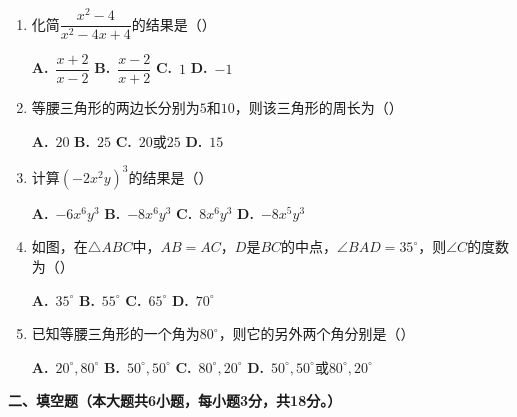 \documentclass[12pt, a4paper]{ctexart}
\begin{document}
\begin{enumerate}[label=\arabic*.]
\item 化简$\dfrac{x^{2}-4}{x^{2}-4x+4}$的结果是（\hspace{1cm}）
\begin{enumerate}[label=\Alph*.]
\quad \textbf{A.}~$\dfrac{x+2}{x-2}$ \quad \textbf{B.}~$\dfrac{x-2}{x+2}$ \quad \textbf{C.}~$1$ \quad \textbf{D.}~$-1$
\end{enumerate}

\item 等腰三角形的两边长分别为$5$和$10$，则该三角形的周长为（\hspace{1cm}）
\begin{enumerate}[label=\Alph*.]
\quad \textbf{A.}~$20$ \quad \textbf{B.}~$25$ \quad \textbf{C.}~$20$或$25$ \quad \textbf{D.}~$15$
\end{enumerate}

\item 计算$(-2x^{2}y)^{3}$的结果是（\hspace{1cm}）
\begin{enumerate}[label=\Alph*.]
\quad \textbf{A.}~$-6x^{6}y^{3}$ \quad \textbf{B.}~$-8x^{6}y^{3}$ \quad \textbf{C.}~$8x^{6}y^{3}$ \quad \textbf{D.}~$-8x^{5}y^{3}$
\end{enumerate}

\item 如图，在$\triangle ABC$中，$AB=AC$，$D$是$BC$的中点，$\angle BAD=35^{\circ}$，则$\angle C$的度数为（\hspace{1cm}）
\begin{enumerate}[label=\Alph*.]
\quad \textbf{A.}~$35^{\circ}$ \quad \textbf{B.}~$55^{\circ}$ \quad \textbf{C.}~$65^{\circ}$ \quad \textbf{D.}~$70^{\circ}$
\end{enumerate}

\item 已知等腰三角形的一个角为$80^{\circ}$，则它的另外两个角分别是（\hspace{1cm}）
\begin{enumerate}[label=\Alph*.]
\quad \textbf{A.}~$20^{\circ},80^{\circ}$ \quad \textbf{B.}~$50^{\circ},50^{\circ}$ \quad \textbf{C.}~$80^{\circ},20^{\circ}$ \quad \textbf{D.}~$50^{\circ},50^{\circ}$或$80^{\circ},20^{\circ}$
\end{enumerate}

\end{enumerate}

\vspace{0.5cm}

{\large\bfseries 二、填空题（本大题共6小题，每小题3分，共18分。）}
\end{document}
